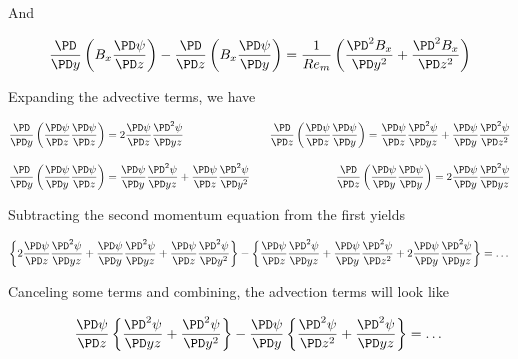 \documentclass[11pt]{article}
\begin{document}
And

\begin{equation}
	\frac{\PD}{\PD y} \left( B_x \frac{\PD \psi}{\PD z} \right)
	- \frac{\PD}{\PD z} \left( B_x \frac{\PD \psi}{\PD y} \right)
	=
	\frac{1}{Re_m}
	\left(
	\frac{\PD^2 B_x}{\PD y^2}
	+ \frac{\PD^2 B_x}{\PD z^2}
	\right)
\end{equation}

Expanding the advective terms, we have

\begin{equation}
	\frac{\PD}{\PD y}
	\left(
	\frac{\PD \psi}{\PD z}
	\frac{\PD \psi}{\PD z}
	\right)
	=
	2
	\frac{\PD \psi }{\PD z}
	\frac{\PD^2 \psi}{\PD yz}
	\qquad \qquad
	\qquad \qquad
	\frac{\PD}{\PD z}
	\left(
	\frac{\PD \psi}{\PD z}
	\frac{\PD \psi}{\PD y}
	\right)
	=
	\frac{\PD \psi}{\PD z}
	\frac{\PD^2 \psi}{\PD yz} +
	\frac{\PD \psi}{\PD y}
	\frac{\PD^2 \psi}{\PD z^2}
\end{equation}

\begin{equation}
	\frac{\PD}{\PD y}
	\left(
	\frac{\PD \psi}{\PD y}
	\frac{\PD \psi}{\PD z}
	\right)
	=
	\frac{\PD \psi}{\PD y}
	\frac{\PD^2 \psi}{\PD yz} +
	\frac{\PD \psi}{\PD z}
	\frac{\PD^2 \psi}{\PD y^2}
	\qquad \qquad
	\qquad \qquad
	\frac{\PD}{\PD z}
	\left(
	\frac{\PD \psi}{\PD y}
	\frac{\PD \psi}{\PD y}
	\right)
	=
	2
	\frac{\PD \psi }{\PD y}
	\frac{\PD^2 \psi}{\PD yz}
\end{equation}

Subtracting the second momentum equation from the first yields

\begin{equation}
	\left\{
	2
	\frac{\PD \psi }{\PD z}
	\frac{\PD^2 \psi}{\PD yz}
	+
	\frac{\PD \psi}{\PD y}
	\frac{\PD^2 \psi}{\PD yz} +
	\frac{\PD \psi}{\PD z}
	\frac{\PD^2 \psi}{\PD y^2}
	\right\}
	-
	\left\{
	\frac{\PD \psi}{\PD z}
	\frac{\PD^2 \psi}{\PD yz} +
	\frac{\PD \psi}{\PD y}
	\frac{\PD^2 \psi}{\PD z^2}
	+
	2
	\frac{\PD \psi }{\PD y}
	\frac{\PD^2 \psi}{\PD yz}
	\right\}
	=
	\dots
\end{equation}

Canceling some terms and combining, the advection terms will look like


\begin{equation}
	\frac{\PD \psi }{\PD z}
	\left\{
	\frac{\PD^2 \psi}{\PD yz}
	+
	\frac{\PD^2 \psi}{\PD y^2}
	\right\}
	-
	\frac{\PD \psi}{\PD y}
	\left\{
	\frac{\PD^2 \psi}{\PD z^2}
	+
	\frac{\PD^2 \psi}{\PD yz}
	\right\}
	=
	\dots
\end{equation}
\end{document}
